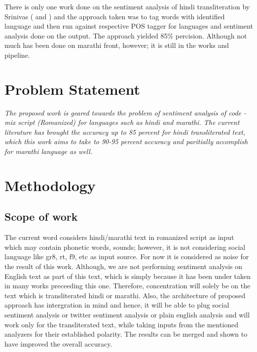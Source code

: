 \documentclass[12pt]{article}
\begin{document}
\fontsize{12}{20}\selectfont There is only one work done on the sentiment analysis of hindi transliteration
by Srinivas (\cite{sharma_text_2015} and \cite{shashank_sharma_sentiment_????}
) and the approach taken was to tag words with identified language and then run
against respective POS tagger for languages and sentiment analysis done on the
output. The approach yielded 85\% percision. Although not much has been done on
marathi front, however; it is still in the works and pipeline.\\

\section{Problem Statement}

\fontsize{12}{20}\selectfont \textit{The proposed work is geared towards the problem of sentiment analysis
    of code - mix script (Romanized) for languages such as hindi and marathi.
    The current literature has brought the accuracy up to 85 percent for hindi
    transliterated text, which this work aims to take to 90-95 percent accuracy
    and paritially accomplish for marathi language as well.}



\section{Methodology}

\subsection{Scope of work}

\fontsize{12}{20}\selectfont The current word considers hindi/marathi text in romanized script as input
which may contain phonetic words, sounds; however, it is not considering social
language like gr8, rt, f9, etc as input source. For now it is considered as
noise for the result of this work. Although, we are not performing sentiment
analysis on English text as part of this text, which is simply because it has
been under taken in many works preceeding this one. Therefore, concentration
will solely be on the text which is transliterated hindi or marathi. Also, the
architecture of proposed approach has intergration in mind and hence, it will
be able to plug social sentiment analysis or twitter sentiment analysis or
plain english analysis and will work only for the transliterated text, while
taking inputs from the mentioned analyzers for their established polarity. The
results can be merged and shown to have improved the overall accuracy. 
\end{document}

